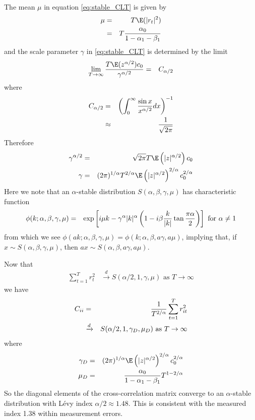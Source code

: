 The mean $\mu$ in equation \ref{eq:stable_CLT} is given by
\begin{eqnarray*}
  \mu &=& T \E(|r_t|^2) \\
  &=& T{\alpha_0 \over 1 - \alpha_1 - \beta_1}
\end{eqnarray*}
and the scale parameter $\gamma$ in \ref{eq:stable_CLT} is determined
by the limit \cite{Bilik2008}
\begin{eqnarray*}
  \lim_{T\to\infty} {T \E(z^{\alpha/2}) c_0 \over \gamma^{\alpha/2}}
  &=& C_{\alpha/2}
\end{eqnarray*}
where
\begin{eqnarray*}
  C_{\alpha/2} &=& \left( \int_0^\infty {\sin x \over x^{\alpha/2}} dx
  \right)^{-1} \\
  &\approx& {1 \over \sqrt{2 \pi}}
\end{eqnarray*}
Therefore
\begin{eqnarray*}
  \gamma^{\alpha/2} &=& \sqrt{2\pi} T \E\left(
    |z|^{\alpha/2}
  \right) c_0 \\
  \gamma &=& (2\pi)^{1/\alpha} T^{2/\alpha} \E\left(
    |z|^{\alpha/2}
  \right)^{2/\alpha} c_0^{2/\alpha}
\end{eqnarray*}
Here we note that an $\alpha$-stable distribution $S(\alpha, \beta,
\gamma, \mu)$ has characteristic function \cite{Guhr2007}
\begin{eqnarray*}
  \phi(k; \alpha, \beta, \gamma, \mu) &=& \exp\left[
    i\mu k - \gamma^\alpha |k|^\alpha \left(
      1 - i \beta {k \over |k|} \tan{\pi \alpha \over 2}
    \right) \right] \text{ for $\alpha \neq 1$}
\end{eqnarray*}
from which we see $\phi(ak; \alpha, \beta, \gamma, \mu) = \phi(k;
\alpha, \beta, a\gamma, a\mu)$, implying that, if $x \sim S(\alpha,
\beta, \gamma, \mu)$, then $ax \sim S(\alpha, \beta, a\gamma, a\mu)$.

Now that
\begin{eqnarray*}
  \sum_{t=1}^T r_t^2 &\xrightarrow{d} S(\alpha/2,
  1, \gamma, \mu) \text{ as $T \to \infty$}  
\end{eqnarray*}
we have
\begin{eqnarray*}
  C_{ii} &=& {1 \over T^{2/\alpha}}\sum_{t=1}^T r_{it}^2 \\
  &\xrightarrow{d}&
  S(\alpha/2, 1, \gamma_D, \mu_D) \text{ as $T \to \infty$}
\end{eqnarray*}
where
\begin{eqnarray}\label{eq:garch_wishart_cij_params}
  \gamma_D &=& (2\pi)^{1/\alpha} \E\left(|z|^{\alpha/2}
  \right)^{2/\alpha} c_0^{2/\alpha} \\
  \mu_D &=& {\alpha_0 \over 1 - \alpha_1 - \beta_1} T^{1 - 2/\alpha}
  \nonumber
\end{eqnarray}
So the diagonal elements of the cross-correlation matrix converge to
an $\alpha$-stable distribution with L\'evy index $\alpha/2 \approx
1.48$. This is consistent with the measured index 1.38 within
measurement errors.

